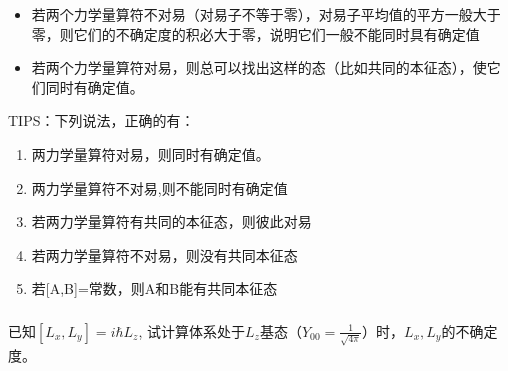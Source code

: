 \begin{frame} [allowframebreaks=]
    \begin{tcolorbox}[colback=yellow!5,colframe=yellow!75!black,title=不确定性关系式的理解]
    \begin{itemize}
        \item 若两个力学量算符不对易（对易子不等于零），对易子平均值的平方一般大于零，则它们的不确定度的积必大于零，说明它们一般不能同时具有确定值
        \item 若两个力学量算符对易，则总可以找出这样的态（比如共同的本征态），使它们同时有确定值。 
    \end{itemize}   
    \end{tcolorbox}
\end{frame} 

\begin{frame} [allowframebreaks=]
    TIPS：下列说法，正确的有：
    \begin{enumerate}
        \item 两力学量算符对易，则同时有确定值。 
        \item 两力学量算符不对易,则不能同时有确定值 
        \item 若两力学量算符有共同的本征态，则彼此对易
        \item 若两力学量算符不对易，则没有共同本征态
        \item 若[A,B]=常数，则A和B能有共同本征态
    \end{enumerate} 
\end{frame} 

\begin{frame} [allowframebreaks=]
    \frametitle{}
    \begin{tcolorbox}[colback=yellow!5,colframe=yellow!75!black,title=课堂作业]
    已知$[L_x, L_y]=i\hbar L_z$, 试计算体系处于$L_z$基态（$Y_{00}=\frac{1}{\sqrt{4\pi}}$）时，$L_x, L_y$的不确定度。
    \end{tcolorbox}
\end{frame} 

